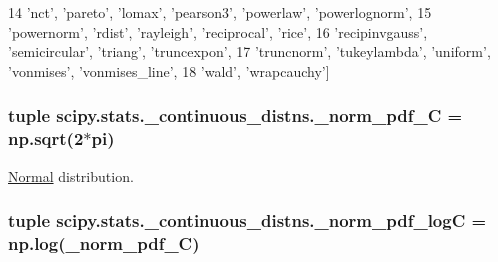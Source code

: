 \begin{DoxyCode}
14     \textcolor{stringliteral}{'nct'}, \textcolor{stringliteral}{'pareto'}, \textcolor{stringliteral}{'lomax'}, \textcolor{stringliteral}{'pearson3'}, \textcolor{stringliteral}{'powerlaw'}, \textcolor{stringliteral}{'powerlognorm'},
15     \textcolor{stringliteral}{'powernorm'}, \textcolor{stringliteral}{'rdist'}, \textcolor{stringliteral}{'rayleigh'}, \textcolor{stringliteral}{'reciprocal'}, \textcolor{stringliteral}{'rice'},
16     \textcolor{stringliteral}{'recipinvgauss'}, \textcolor{stringliteral}{'semicircular'}, \textcolor{stringliteral}{'triang'}, \textcolor{stringliteral}{'truncexpon'},
17     \textcolor{stringliteral}{'truncnorm'}, \textcolor{stringliteral}{'tukeylambda'}, \textcolor{stringliteral}{'uniform'}, \textcolor{stringliteral}{'vonmises'}, \textcolor{stringliteral}{'vonmises\_line'},
18     \textcolor{stringliteral}{'wald'}, \textcolor{stringliteral}{'wrapcauchy'}]
\end{DoxyCode}
\hypertarget{namespacescipy_1_1stats_1_1__continuous__distns_ae8c358a332576d79dfde21f1f3b24b6e}{}
\subsubsection[{\+\_\+norm\+\_\+pdf\+\_\+\+C}]{\setlength{\rightskip}{0pt plus 5cm}tuple scipy.\+stats.\+\_\+continuous\+\_\+distns.\+\_\+norm\+\_\+pdf\+\_\+\+C = {\bf np.\+sqrt}(2$\ast$pi)}\label{namespacescipy_1_1stats_1_1__continuous__distns_ae8c358a332576d79dfde21f1f3b24b6e}


\hyperlink{classNormal}{Normal} distribution. 

\hypertarget{namespacescipy_1_1stats_1_1__continuous__distns_ad05ebf13d9bf973492d6a8e181444c94}{}
\subsubsection[{\+\_\+norm\+\_\+pdf\+\_\+log\+C}]{\setlength{\rightskip}{0pt plus 5cm}tuple scipy.\+stats.\+\_\+continuous\+\_\+distns.\+\_\+norm\+\_\+pdf\+\_\+log\+C = {\bf np.\+log}({\bf \+\_\+norm\+\_\+pdf\+\_\+\+C})}\label{namespacescipy_1_1stats_1_1__continuous__distns_ad05ebf13d9bf973492d6a8e181444c94}
\hypertarget{namespacescipy_1_1stats_1_1__continuous__distns_a7f01ce8f4f0a8f0106591aa4ff8dd4ba}{}
